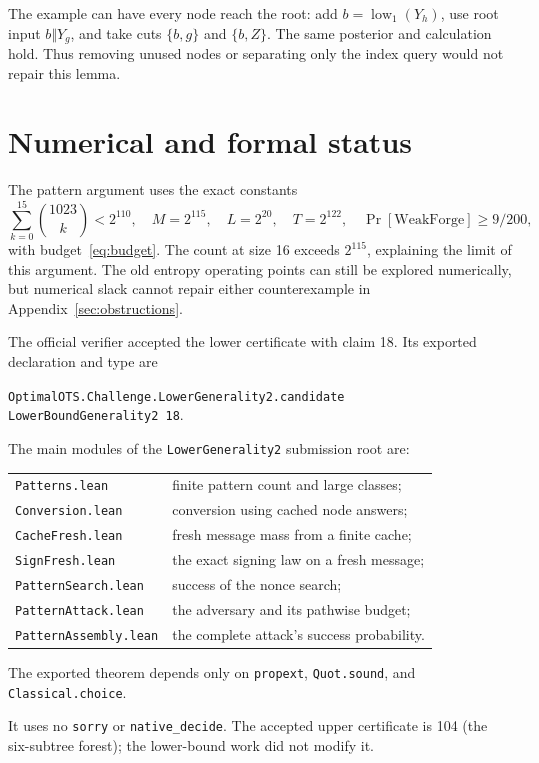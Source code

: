 \documentclass[10pt]{article}
\begin{document}
The example can have every node reach the root: add $b=\operatorname{low}_1(Y_h)$, use root input $b\Vert Y_g$, and take cuts $\{b,g\}$ and $\{b,Z\}$. The same posterior and calculation hold. Thus removing unused nodes or separating only the index query would not repair this lemma.

\section{Numerical and formal status}\label{sec:numerical}

The pattern argument uses the exact constants
\[
\sum_{k=0}^{15}\binom{1023}{k}<2^{110},\quad
M=2^{115},\quad L=2^{20},\quad T=2^{122},\quad
\Pr[\mathrm{WeakForge}]\ge9/200,
\]
with budget~\eqref{eq:budget}. The count at size 16 exceeds $2^{115}$, explaining the limit of this argument. The old entropy operating points can still be explored numerically, but numerical slack cannot repair either counterexample in Appendix~\ref{sec:obstructions}.

The official verifier accepted the lower certificate with claim 18. Its exported declaration and type are
\begin{center}
\texttt{OptimalOTS.Challenge.LowerGenerality2.candidate}\\
\texttt{LowerBoundGenerality2 18}.
\end{center}
The main modules of the \texttt{LowerGenerality2} submission root are:
\begin{center}
\begin{tabular}{ll}
\texttt{Patterns.lean} & finite pattern count and large classes;\\
\texttt{Conversion.lean} & conversion using cached node answers;\\
\texttt{CacheFresh.lean} & fresh message mass from a finite cache;\\
\texttt{SignFresh.lean} & the exact signing law on a fresh message;\\
\texttt{PatternSearch.lean} & success of the nonce search;\\
\texttt{PatternAttack.lean} & the adversary and its pathwise budget;\\
\texttt{PatternAssembly.lean} & the complete attack's success probability.
\end{tabular}
\end{center}
The exported theorem depends only on \texttt{propext}, \texttt{Quot.sound}, and \texttt{Classical.choice}.

It uses no \texttt{sorry} or \texttt{native\_decide}. The accepted upper certificate is 104 (the six-subtree forest); the lower-bound work did not modify it.
\end{document}
